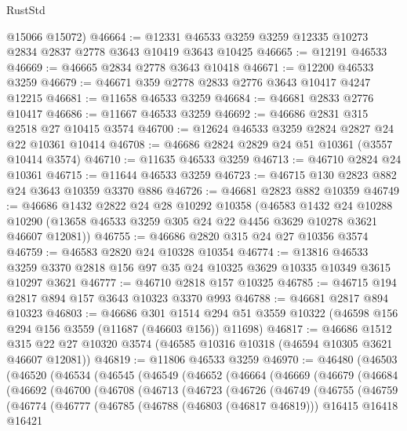 \begin{lexlean}{RustStd}
\begin{coremodule}
      @15066
      @15072)
@46664 := @12331 @46533 @3259 @3259 @12335 @10273 @2834 @2837 @2778 @3643 @10419 @3643 @10425
@46665 := @12191 @46533
@46669 := @46665 @2834 @2778 @3643 @10418
@46671 := @12200 @46533 @3259
@46679 := @46671 @359 @2778 @2833 @2776 @3643 @10417 @4247 @12215
@46681 := @11658 @46533 @3259
@46684 := @46681 @2833 @2776 @10417
@46686 := @11667 @46533 @3259
@46692 := @46686 @2831 @315 @2518 @27 @10415 @3574
@46700 := @12624 @46533 @3259 @2824 @2827 @24 @22 @10361 @10414
@46708 := @46686 @2824 @2829 @24 @51 @10361 (@3557 @10414 @3574)
@46710 := @11635 @46533 @3259
@46713 := @46710 @2824 @24 @10361
@46715 := @11644 @46533 @3259
@46723 := @46715 @130 @2823 @882 @24 @3643 @10359 @3370 @886
@46726 := @46681 @2823 @882 @10359
@46749 := @46686
    @1432
    @2822
    @24
    @28
    @10292
    @10358
    (@46583
      @1432
      @24
      @10288
      @10290
      (@13658 @46533 @3259 @305 @24 @22 @4456 @3629 @10278 @3621 @46607 @12081))
@46755 := @46686 @2820 @315 @24 @27 @10356 @3574
@46759 := @46583 @2820 @24 @10328 @10354
@46774 := @13816
    @46533
    @3259
    @3370
    @2818
    @156
    @97
    @35
    @24
    @10325
    @3629
    @10335
    @10349
    @3615
    @10297
    @3621
@46777 := @46710 @2818 @157 @10325
@46785 := @46715 @194 @2817 @894 @157 @3643 @10323 @3370 @993
@46788 := @46681 @2817 @894 @10323
@46803 := @46686
    @301
    @1514
    @294
    @51
    @3559
    @10322
    (@46598 @156 @294 @156 @3559 (@11687 (@46603 @156)) @11698)
@46817 := @46686
    @1512
    @315
    @22
    @27
    @10320
    @3574
    (@46585 @10316 @10318 (@46594 @10305 @3621 @46607 @12081))
@46819 := @11806 @46533 @3259
@46970 := @46480
    (@46503
      (@46520
        (@46534
          (@46545
            (@46549
              (@46652
                (@46664
                  (@46669
                    (@46679
                      (@46684
                        (@46692
                          (@46700
                            (@46708
                              (@46713
                                (@46723
                                  (@46726
                                    (@46749
                                      (@46755
                                        (@46759
                                          (@46774
                                            (@46777
                                              (@46785
                                                (@46788 (@46803 (@46817 @46819)))
                                                @16415
                                                @16418
                                                @16421

\end{coremodule}
\end{lexlean}
